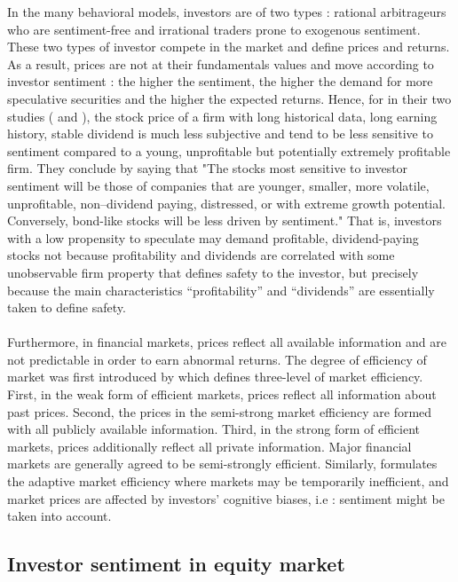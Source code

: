 \documentclass{article}
\begin{document}
	In the many behavioral models, investors are of two types : rational arbitrageurs who are sentiment-free and irrational traders prone to exogenous sentiment. These two types of investor compete in the market and define prices and returns. As a result, prices are not at their fundamentals values and move according to investor sentiment : the higher the sentiment, the higher the demand for more speculative securities and the higher the expected returns. Hence, for \citeauthor{isits} in their two studies (\cite{isatc} and \cite{isits}), the stock price of a firm with long historical data, long earning history, stable dividend is much less subjective and tend to be less sensitive to sentiment compared to a young, unprofitable but potentially extremely profitable firm. They conclude by saying that "The stocks most sensitive to investor sentiment will be those of companies that are younger, smaller, more volatile, unprofitable, non–dividend paying, distressed, or with extreme growth potential. Conversely, bond-like stocks will be less driven by sentiment." That is, investors with a low propensity to speculate may demand profitable, dividend-paying stocks not because profitability and dividends are correlated with some unobservable firm property that defines safety to the investor, but precisely because the main characteristics “profitability” and “dividends” are essentially taken to define safety. \\\\
	Furthermore, in financial markets, prices reflect all available information and are not predictable in order to earn abnormal returns. The degree of efficiency of market was first introduced by \cite{ecmar} which defines three-level of market efficiency. First, in the weak form of efficient markets, prices reflect all information about past prices. Second, the prices in the semi-strong market efficiency are formed with all publicly available information. Third, in the strong form of efficient markets, prices additionally reflect all private information. Major financial markets are generally agreed to be semi-strongly efficient. Similarly, \cite{amfea} formulates the adaptive market efficiency where markets may be temporarily inefficient, and market prices are affected by investors' cognitive biases, i.e : sentiment might be taken into account. 
	
	\subsection{Investor sentiment in equity market}
	
\end{document}
